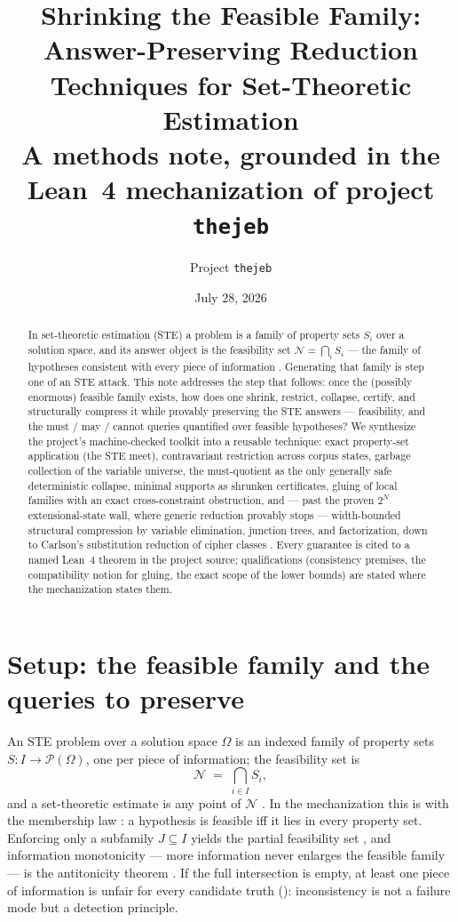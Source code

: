 \documentclass[11pt]{article}
\title{Shrinking the Feasible Family:\\
Answer-Preserving Reduction Techniques for Set-Theoretic Estimation\\
\large A methods note, grounded in the Lean~4 mechanization of project
\texttt{thejeb}}
\author{Project \texttt{thejeb}}
\date{July 28, 2026}
\newcommand{\Hyp}{\Omega}
\newcommand{\Feas}{\mathcal N}
\begin{document}
\maketitle

\begin{abstract}
In set-theoretic estimation (STE) a problem is a family of property sets
$S_i$ over a solution space, and its answer object is the feasibility set
$\Feas=\bigcap_i S_i$ --- the family of hypotheses consistent with every
piece of information \citep{combettes1993}.  Generating that family is
step one of an STE attack.  This note addresses the step that follows:
once the (possibly enormous) feasible family exists, how does one
shrink, restrict, collapse, certify, and structurally compress it while
provably preserving the STE answers --- feasibility, and the must / may
/ cannot queries quantified over feasible hypotheses?  We synthesize the
project's machine-checked toolkit into a reusable technique: exact
property-set application (the STE meet), contravariant restriction
across corpus states, garbage collection of the variable universe, the
must-quotient as the only generally safe deterministic collapse, minimal
supports as shrunken certificates, gluing of local families with an
exact cross-constraint obstruction, and --- past the proven $2^N$
extensional-state wall, where generic reduction provably stops ---
width-bounded structural compression by variable elimination, junction
trees, and factorization, down to Carlson's substitution reduction of
cipher classes \citep{carlson2012}.  Every guarantee is cited to a named
Lean~4 theorem in the project source; qualifications (consistency
premises, the compatibility notion for gluing, the exact scope of the
lower bounds) are stated where the mechanization states them.
\end{abstract}

\section{Setup: the feasible family and the queries to preserve}
\label{sec:setup}

An STE problem over a solution space $\Hyp$ is an indexed family of
property sets $S:I\to\mathcal P(\Hyp)$, one per piece of information;
the feasibility set is
\[
\Feas \;=\; \bigcap_{i\in I} S_i,
\]
and a set-theoretic estimate is any point of $\Feas$
\citep[\S II-C]{combettes1993}.  In the mechanization this is
 with the membership law
: a hypothesis is feasible iff it lies in every
property set.  Enforcing only a subfamily $J\subseteq I$ yields the
partial feasibility set , and information
monotonicity --- more information never enlarges the feasible family ---
is the antitonicity theorem .  If
the full intersection is empty, at least one piece of information is
unfair for every candidate truth
(): inconsistency is not
a failure mode but a detection principle.
\end{document}
